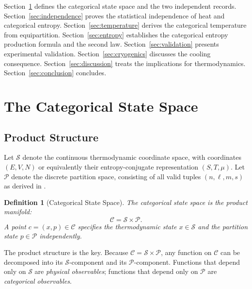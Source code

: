 \documentclass[twocolumn,10pt]{article}
\newtheorem{definition}[theorem]{Definition}
\begin{document}
Section~\ref{sec:statespace} defines the categorical state space and the two independent records. Section~\ref{sec:independence} proves the statistical independence of heat and categorical entropy. Section~\ref{sec:temperature} derives the categorical temperature from equipartition. Section~\ref{sec:entropy} establishes the categorical entropy production formula and the second law. Section~\ref{sec:validation} presents experimental validation. Section~\ref{sec:cryogenics} discusses the cooling consequence. Section~\ref{sec:discussion} treats the implications for thermodynamics. Section~\ref{sec:conclusion} concludes.

\section{The Categorical State Space}
\label{sec:statespace}

\subsection{Product Structure}

Let $\mathcal{S}$ denote the continuous thermodynamic coordinate space, with coordinates $(E, V, N)$ or equivalently their entropy-conjugate representation $(S, T, \mu)$. Let $\mathcal{P}$ denote the discrete partition space, consisting of all valid tuples $(n, \ell, m, s)$ as derived in \citep{partitioncounting}.

\begin{definition}[Categorical State Space]
\label{def:catspace}
The categorical state space is the product manifold:
\begin{equation}
    \mathcal{C} = \mathcal{S} \times \mathcal{P}.
\end{equation}
A point $c = (x, p) \in \mathcal{C}$ specifies the thermodynamic state $x \in \mathcal{S}$ and the partition state $p \in \mathcal{P}$ independently.
\end{definition}

The product structure is the key. Because $\mathcal{C} = \mathcal{S} \times \mathcal{P}$, any function on $\mathcal{C}$ can be decomposed into its $\mathcal{S}$-component and its $\mathcal{P}$-component. Functions that depend only on $\mathcal{S}$ are \emph{physical observables}; functions that depend only on $\mathcal{P}$ are \emph{categorical observables}.
\end{document}
